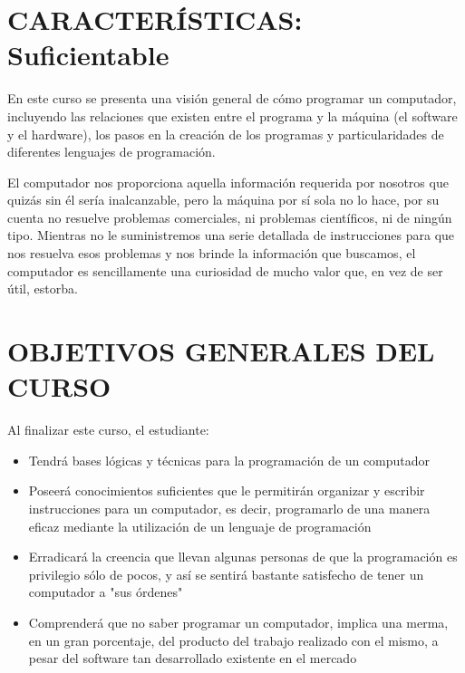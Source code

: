 

\section{CARACTERÍSTICAS: Suficientable}

En este curso se presenta una visión general de cómo programar un computador, incluyendo las relaciones que existen entre el programa y la máquina (el software y el hardware), los pasos en la creación de los programas y particularidades de diferentes lenguajes de programación.

El computador nos proporciona aquella información requerida por nosotros que quizás sin él sería inalcanzable, pero la máquina por sí sola no lo hace, por su cuenta no resuelve problemas comerciales, ni problemas científicos, ni de ningún tipo. Mientras no le suministremos una serie detallada de instrucciones para que nos resuelva esos problemas y nos brinde la información que buscamos, el computador es sencillamente una curiosidad de mucho valor que, en vez de ser útil, estorba.

\section{OBJETIVOS GENERALES DEL CURSO}

Al finalizar este curso, el estudiante:

\begin{itemize}
	\item Tendrá bases lógicas y técnicas para la programación de un computador 

	\item Poseerá conocimientos suficientes que le permitirán organizar y escribir instrucciones para un computador, es decir, programarlo de una manera eficaz mediante la utilización de un lenguaje de programación

	\item Erradicará la creencia que llevan algunas personas de que la programación es privilegio sólo de pocos, y así se sentirá bastante satisfecho de tener un computador a "sus órdenes"

	\item Comprenderá que no saber programar un computador, implica una merma, en un gran porcentaje, del producto del trabajo realizado con el mismo, a pesar del software tan desarrollado existente en el mercado
\end{itemize}
